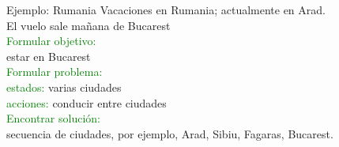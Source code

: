 \begin{frame}{Ejemplo: Rumania}
Vacaciones en Rumania; actualmente en Arad.\\
El vuelo sale mañana de Bucarest\\
\textcolor{Green}{Formular objetivo:}\\
\hspace{0.8cm}estar en Bucarest\\
\textcolor{Green}{Formular problema:}\\
\hspace{0.8cm}\textcolor{Green}{estados:} varias ciudades\\
\hspace{0.8cm}\textcolor{Green}{acciones:} conducir entre ciudades\\
\textcolor{Green}{Encontrar solución:}\\
\hspace{0.8cm}secuencia de ciudades, por ejemplo, Arad, Sibiu, Fagaras, Bucarest.
\end{frame}